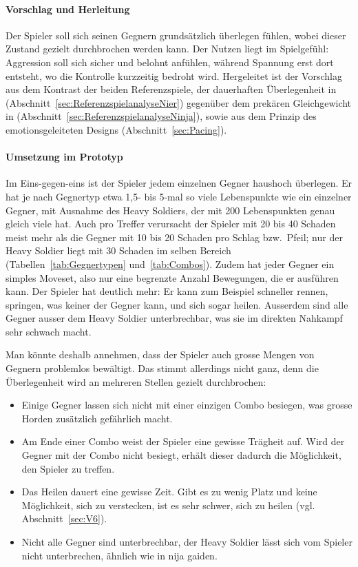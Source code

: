 \documentclass[../Main.tex]{subfiles}
\begin{document}
\paragraph{Vorschlag und Herleitung}
Der Spieler soll sich seinen Gegnern grundsätzlich überlegen fühlen, wobei dieser Zustand gezielt durchbrochen werden kann. Der Nutzen liegt im Spielgefühl: Aggression soll sich sicher und belohnt anfühlen, während Spannung erst dort entsteht, wo die Kontrolle kurzzeitig bedroht wird. Hergeleitet ist der Vorschlag aus dem Kontrast der beiden Referenzspiele, der dauerhaften Überlegenheit in  (Abschnitt~\ref{sec:ReferenzspielanalyseNier}) gegenüber dem prekären Gleichgewicht in  (Abschnitt~\ref{sec:ReferenzspielanalyseNinja}), sowie aus dem Prinzip des emotionsgeleiteten Designs (Abschnitt~\ref{sec:Pacing}).

\paragraph{Umsetzung im Prototyp}
Im Eins-gegen-eins ist der Spieler jedem einzelnen Gegner haushoch überlegen. Er hat je nach Gegnertyp etwa 1,5- bis 5-mal so viele Lebenspunkte wie ein einzelner Gegner, mit Ausnahme des Heavy Soldiers, der mit 200 Lebenspunkten genau gleich viele hat. Auch pro Treffer verursacht der Spieler mit 20 bis 40 Schaden meist mehr als die Gegner mit 10 bis 20 Schaden pro Schlag bzw.\ Pfeil; nur der Heavy Soldier liegt mit 30 Schaden im selben Bereich (Tabellen~\ref{tab:Gegnertypen} und~\ref{tab:Combos}). Zudem hat jeder Gegner ein simples Moveset, also nur eine begrenzte Anzahl Bewegungen, die er ausführen kann. Der Spieler hat deutlich mehr: Er kann zum Beispiel schneller rennen, springen, was keiner der Gegner kann, und sich sogar heilen. Ausserdem sind alle Gegner ausser dem Heavy Soldier unterbrechbar, was sie im direkten Nahkampf sehr schwach macht.

Man könnte deshalb annehmen, dass der Spieler auch grosse Mengen von Gegnern problemlos bewältigt. Das stimmt allerdings nicht ganz, denn die Überlegenheit wird an mehreren Stellen gezielt durchbrochen:

\begin{itemize}[leftmargin=1.5cm]
    \item Einige Gegner lassen sich nicht mit einer einzigen Combo besiegen, was grosse Horden zusätzlich gefährlich macht.
    \item Am Ende einer Combo weist der Spieler eine gewisse Trägheit auf. Wird der Gegner mit der Combo nicht besiegt, erhält dieser dadurch die Möglichkeit, den Spieler zu treffen.
    \item Das Heilen dauert eine gewisse Zeit. Gibt es zu wenig Platz und keine Möglichkeit, sich zu verstecken, ist es sehr schwer, sich zu heilen (vgl. Abschnitt~\ref{sec:V6}).
    \item Nicht alle Gegner sind unterbrechbar, der Heavy Soldier lässt sich vom Spieler nicht unterbrechen, ähnlich wie in nija gaiden.
\end{itemize}
\end{document}
